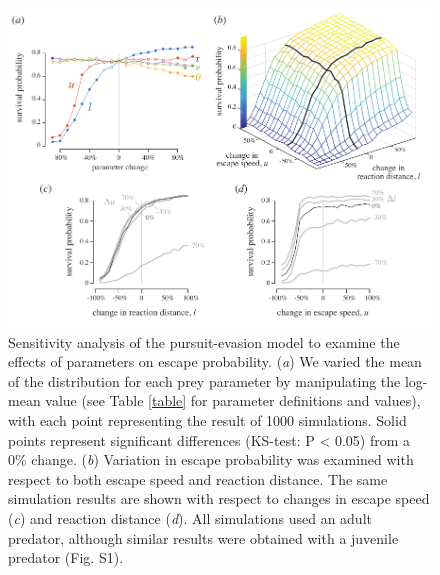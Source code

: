 \documentclass[]{rsos}%
\begin{document}
\begin{figure}[!h]
\centering
	\includegraphics[width=5.5in]{fig_sensitivity}
\caption{Sensitivity analysis of the pursuit-evasion model to examine the effects of parameters on escape probability.   
(\textit{a}) We varied the mean of the distribution for each prey parameter by manipulating the log-mean value (see Table \ref{table} for parameter definitions and values), with each point representing the result of 1000 simulations. 
Solid points represent significant differences (KS-test: P < 0.05) from a 0\% change.
(\textit{b}) Variation in escape probability was examined with respect to both escape speed and reaction distance.
The same simulation results are shown with respect to changes in escape speed (\textit{c}) and reaction distance (\textit{d}). All simulations used an adult predator, although similar results were obtained with a juvenile predator (Fig. S1).
}
\label{fig_sense}
\end{figure}

\pagebreak
\end{document}
